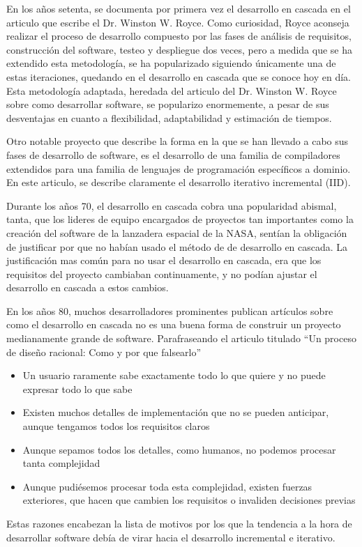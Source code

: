 \documentclass[12pt]{report} %
\begin{document}
En los años setenta, se documenta por primera vez el desarrollo en cascada en el articulo que escribe el Dr. Winston W. Royce.
Como curiosidad, Royce aconseja realizar el proceso de desarrollo compuesto por las fases de análisis de requisitos, construcción del software, testeo y despliegue dos veces, pero a medida que se ha extendido esta metodología, se ha popularizado siguiendo únicamente una de estas iteraciones, quedando en el desarrollo en cascada que se conoce hoy en día. \cite{royce1970}
Esta metodología adaptada, heredada del articulo del Dr. Winston W. Royce sobre como desarrollar software, se popularizo enormemente, a pesar de sus desventajas en cuanto a flexibilidad, adaptabilidad y estimación de tiempos.

Otro notable proyecto que describe la forma en la que se han llevado a cabo sus fases de desarrollo de software, es el desarrollo de una familia de compiladores extendidos para una familia de lenguajes de programación específicos a dominio.
En este articulo, se describe claramente el desarrollo iterativo incremental (IID). \cite{6312870}

Durante los años 70, el desarrollo en cascada cobra una popularidad abismal, tanta, que los lideres de equipo encargados de proyectos tan importantes como la creación del software de la lanzadera espacial de la NASA, sentían la obligación de justificar por que no habían usado el método de de desarrollo en cascada.
La justificación mas común para no usar el desarrollo en cascada, era que los requisitos del proyecto cambiaban continuamente, y no podían ajustar el desarrollo en cascada a estos cambios.

En los años 80, muchos desarrolladores prominentes publican artículos sobre como el desarrollo en cascada no es una buena forma de construir un proyecto medianamente grande de software.
Parafraseando el articulo titulado ``Un proceso de diseño racional: Como y por que falsearlo'' \cite{Parnas1986}
\begin{itemize}
  \item{Un usuario raramente sabe exactamente todo lo que quiere y no puede expresar todo lo que sabe}
  \item{Existen muchos detalles de implementación que no se pueden anticipar, aunque tengamos todos los requisitos claros}
  \item{Aunque sepamos todos los detalles, como humanos, no podemos procesar tanta complejidad}
  \item{Aunque pudiésemos procesar toda esta complejidad, existen fuerzas exteriores, que hacen que cambien los requisitos o invaliden decisiones previas}
\end{itemize}
Estas razones encabezan la lista de motivos por los que la tendencia a la hora de desarrollar software debía de virar hacia el desarrollo incremental e iterativo.
\end{document}
